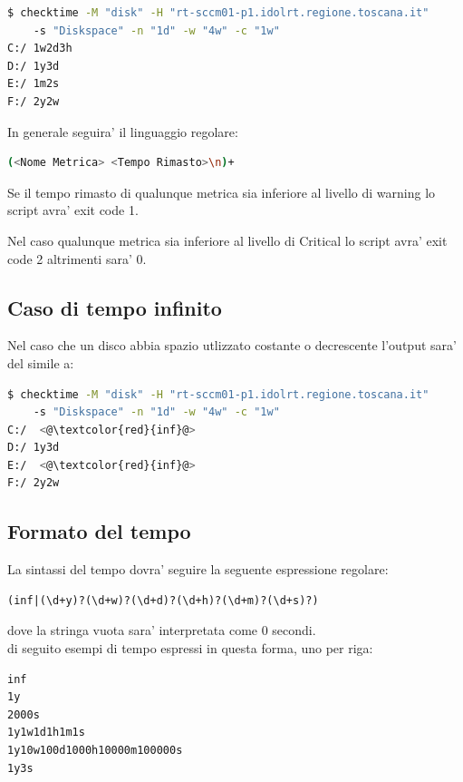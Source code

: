 \documentclass{article}
\begin{document}
\begin{lstlisting}[language=Bash]
$ checktime -M "disk" -H "rt-sccm01-p1.idolrt.regione.toscana.it" 
    -s "Diskspace" -n "1d" -w "4w" -c "1w"
C:/ 1w2d3h
D:/ 1y3d
E:/ 1m2s
F:/ 2y2w
\end{lstlisting}

In generale seguira' il linguaggio regolare:

\begin{lstlisting}[language=Bash]
(<Nome Metrica> <Tempo Rimasto>\n)+
\end{lstlisting}

Se il tempo rimasto di qualunque metrica sia inferiore al livello di warning lo script avra' exit code 1.

Nel caso qualunque metrica sia inferiore al livello di Critical lo script avra' exit code 2 altrimenti sara' 0.

\subsection*{Caso di tempo infinito}
Nel caso che un disco abbia spazio utlizzato costante o decrescente l'output sara' del simile a:

\begin{lstlisting}[language=Bash]
$ checktime -M "disk" -H "rt-sccm01-p1.idolrt.regione.toscana.it" 
    -s "Diskspace" -n "1d" -w "4w" -c "1w"
C:/  <@\textcolor{red}{inf}@>
D:/ 1y3d
E:/  <@\textcolor{red}{inf}@>
F:/ 2y2w
\end{lstlisting}

\subsection*{Formato del tempo}
La sintassi del tempo dovra' seguire la seguente espressione regolare:

\begin{lstlisting}[]
(inf|(\d+y)?(\d+w)?(\d+d)?(\d+h)?(\d+m)?(\d+s)?) 
\end{lstlisting}

dove la stringa vuota sara' interpretata come 0 secondi.
\\
di seguito esempi di tempo espressi in questa forma, uno per riga:

\begin{lstlisting}[language=Bash]
inf
1y
2000s
1y1w1d1h1m1s
1y10w100d1000h10000m100000s
1y3s
\end{lstlisting}


\clearpage
\end{document}
